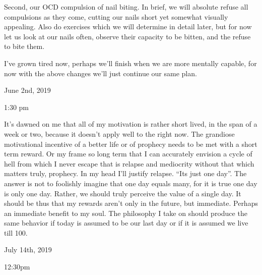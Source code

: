 Second, our OCD compulsion of nail biting. In brief, we will absolute
refuse all compulsions as they come, cutting our nails short yet
somewhat visually appealing. Also do exercises which we will determine
in detail later, but for now let us look at our nails often, observe
their capacity to be bitten, and the refuse to bite them.

I've grown tired now, perhaps we'll finish when we are more mentally
capable, for now with the above changes we'll just continue our same
plan.

\bigskip
\bigskip
June 2nd, 2019

1:30 pm

It's dawned on me that all of my motivation is rather short lived, in
the span of a week or two, because it doesn't apply well to the right
now. The grandiose motivational incentive of a better life or of
prophecy needs to be met with a short term reward. Or my frame so long
term that I can accurately envision a cycle of hell from which I never
escape that is relapse and mediocrity without that which matters truly,
prophecy. In my head I'll justify relapse. ``Its just one day''. The
answer is not to foolishly imagine that one day equals many, for it is
true one day is only one day. Rather, we should truly perceive the value
of a single day. It should be thus that my rewards aren't only in the
future, but immediate. Perhaps an immediate benefit to my soul. The
philosophy I take on should produce the same behavior if today is
assumed to be our last day or if it is assumed we live till 100.

\bigskip
\bigskip
July 14th, 2019

12:30pm

